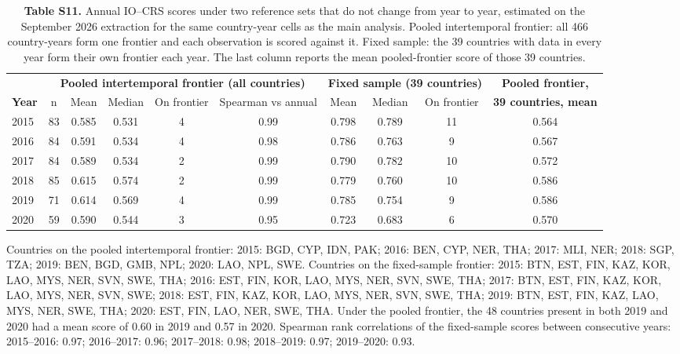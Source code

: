 \documentclass[11pt,letterpaper]{article}
\begin{document}
\clearpage
\begin{table}[htbp]
\footnotesize
\setlength{\tabcolsep}{4pt}
\caption{\textbf{Table S11.} Annual IO--CRS scores under two reference sets that do not change from year to year, estimated on the September 2026 extraction for the same country-year cells as the main analysis. Pooled intertemporal frontier: all 466 country-years form one frontier and each observation is scored against it.\citep{tulkens1995} Fixed sample: the 39 countries with data in every year form their own frontier each year. The last column reports the mean pooled-frontier score of those 39 countries.}
\begin{tabular}{@{}lccccc ccc c@{}}
\toprule
& \multicolumn{5}{c}{\textbf{Pooled intertemporal frontier (all countries)}} & \multicolumn{3}{c}{\textbf{Fixed sample (39 countries)}} & \textbf{Pooled frontier,} \\
\cmidrule(lr){2-6}\cmidrule(lr){7-9}
\textbf{Year} & n & Mean & Median & On frontier & Spearman vs annual & Mean & Median & On frontier & \textbf{39 countries, mean} \\
\midrule
2015 & 83 & 0.585 & 0.531 & 4 & 0.99 & 0.798 & 0.789 & 11 & 0.564 \\
2016 & 84 & 0.591 & 0.534 & 4 & 0.98 & 0.786 & 0.763 & 9 & 0.567 \\
2017 & 84 & 0.589 & 0.534 & 2 & 0.99 & 0.790 & 0.782 & 10 & 0.572 \\
2018 & 85 & 0.615 & 0.574 & 2 & 0.99 & 0.779 & 0.760 & 10 & 0.586 \\
2019 & 71 & 0.614 & 0.569 & 4 & 0.99 & 0.785 & 0.754 & 9 & 0.586 \\
2020 & 59 & 0.590 & 0.544 & 3 & 0.95 & 0.723 & 0.683 & 6 & 0.570 \\
\bottomrule
\end{tabular}

\vspace{4pt}
{\footnotesize Countries on the pooled intertemporal frontier: 2015: BGD, CYP, IDN, PAK; 2016: BEN, CYP, NER, THA; 2017: MLI, NER; 2018: SGP, TZA; 2019: BEN, BGD, GMB, NPL; 2020: LAO, NPL, SWE. Countries on the fixed-sample frontier: 2015: BTN, EST, FIN, KAZ, KOR, LAO, MYS, NER, SVN, SWE, THA; 2016: EST, FIN, KOR, LAO, MYS, NER, SVN, SWE, THA; 2017: BTN, EST, FIN, KAZ, KOR, LAO, MYS, NER, SVN, SWE; 2018: EST, FIN, KAZ, KOR, LAO, MYS, NER, SVN, SWE, THA; 2019: BTN, EST, FIN, KAZ, LAO, MYS, NER, SWE, THA; 2020: EST, FIN, LAO, NER, SWE, THA. Under the pooled frontier, the 48 countries present in both 2019 and 2020 had a mean score of 0.60 in 2019 and 0.57 in 2020. Spearman rank correlations of the fixed-sample scores between consecutive years: 2015--2016: 0.97; 2016--2017: 0.96; 2017--2018: 0.98; 2018--2019: 0.97; 2019--2020: 0.93.}
\end{table}
\end{document}
